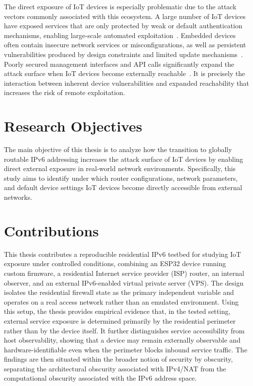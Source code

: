 The direct exposure of IoT devices is especially problematic due to the attack vectors commonly associated with this ecosystem. A large number of IoT devices have exposed services that are only protected by weak or default authentication mechanisms, enabling large-scale automated exploitation~\cite{antonakakis2017mirai}. Embedded devices often contain insecure network services or misconfigurations, as well as persistent vulnerabilities produced by design constraints and limited update mechanisms~\cite{costin2014firmware}. Poorly secured management interfaces and API calls significantly expand the attack surface when IoT devices become externally reachable~\cite{fernandes2016smarthome}. It is precisely the interaction between inherent device vulnerabilities and expanded reachability that increases the risk of remote exploitation.

\section{Research Objectives}
The main objective of this thesis is to analyze how the transition to globally routable IPv6 addressing increases the attack surface of IoT devices by enabling direct external exposure in real-world network environments. Specifically, this study aims to identify under which router configurations, network parameters, and default device settings IoT devices become directly accessible from external networks. 

\section{Contributions}
This thesis contributes a reproducible residential IPv6 testbed for studying IoT exposure under controlled conditions, combining an ESP32 device running custom firmware, a residential Internet service provider (ISP) router, an internal observer, and an external IPv6-enabled virtual private server (VPS). The design isolates the residential firewall state as the primary independent variable and operates on a real access network rather than an emulated environment.
Using this setup, the thesis provides empirical evidence that, in the tested setting, external service exposure is determined primarily by the residential perimeter rather than by the device itself. It further distinguishes service accessibility from host observability, showing that a device may remain externally observable and hardware-identifiable even when the perimeter blocks inbound service traffic. The findings are then situated within the broader notion of security by obscurity, separating the architectural obscurity associated with IPv4/NAT from the computational obscurity associated with the IPv6 address space.

